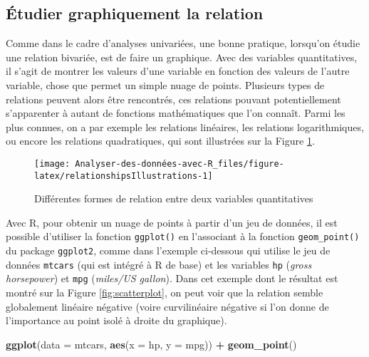 \documentclass[
  french,
]{book}
\newenvironment{Shaded}{\begin{snugshade}}{\end{snugshade}}
\newcommand{\DataTypeTok}[1]{\textcolor[rgb]{0.13,0.29,0.53}{#1}}
\newcommand{\KeywordTok}[1]{\textcolor[rgb]{0.13,0.29,0.53}{\textbf{#1}}}
\newcommand{\NormalTok}[1]{#1}
\newcommand{\OperatorTok}[1]{\textcolor[rgb]{0.81,0.36,0.00}{\textbf{#1}}}
\newcommand{\StringTok}[1]{\textcolor[rgb]{0.31,0.60,0.02}{#1}}
\begin{document}
\hypertarget{uxe9tudier-graphiquement-la-relation}{%
\subsection{Étudier graphiquement la relation}\label{uxe9tudier-graphiquement-la-relation}}

Comme dans le cadre d'analyses univariées, une bonne pratique, lorsqu'on étudie une relation bivariée, est de faire un graphique. Avec des variables quantitatives, il s'agit de montrer les valeurs d'une variable en fonction des valeurs de l'autre variable, chose que permet un simple nuage de points. Plusieurs types de relations peuvent alors être rencontrés, ces relations pouvant potentiellement s'apparenter à autant de fonctions mathématiques que l'on connaît. Parmi les plus connues, on a par exemple les relations linéaires, les relations logarithmiques, ou encore les relations quadratiques, qui sont illustrées sur la Figure \ref{fig:relationshipsIllustrations}.

\begin{figure}

{\centering \texttt{[image: Analyser-des-données-avec-R\_files/figure-latex/relationshipsIllustrations-1]} 

}

\caption{Différentes formes de relation entre deux variables quantitatives}\label{fig:relationshipsIllustrations}
\end{figure}

Avec R, pour obtenir un nuage de points à partir d'un jeu de données, il est possible d'utiliser la fonction \texttt{ggplot()} en l'associant à la fonction \texttt{geom\_point()} du package \texttt{ggplot2}, comme dans l'exemple ci-dessous qui utilise le jeu de données \texttt{mtcars} (qui est intégré à R de base) et les variables \texttt{hp} (\emph{gross horsepower}) et \texttt{mpg} (\emph{miles/US gallon}). Dans cet exemple dont le résultat est montré sur la Figure \ref{fig:scatterplot}, on peut voir que la relation semble globalement linéaire négative (voire curvilinéaire négative si l'on donne de l'importance au point isolé à droite du graphique).

\begin{Shaded}
\begin{Highlighting}[]
\KeywordTok{ggplot}\NormalTok{(}\DataTypeTok{data =}\NormalTok{ mtcars, }\KeywordTok{aes}\NormalTok{(}\DataTypeTok{x =}\NormalTok{ hp, }\DataTypeTok{y =}\NormalTok{ mpg)) }\OperatorTok{+}\StringTok{ }
\StringTok{  }\KeywordTok{geom_point}\NormalTok{()}
\end{Highlighting}
\end{Shaded}
\end{document}
